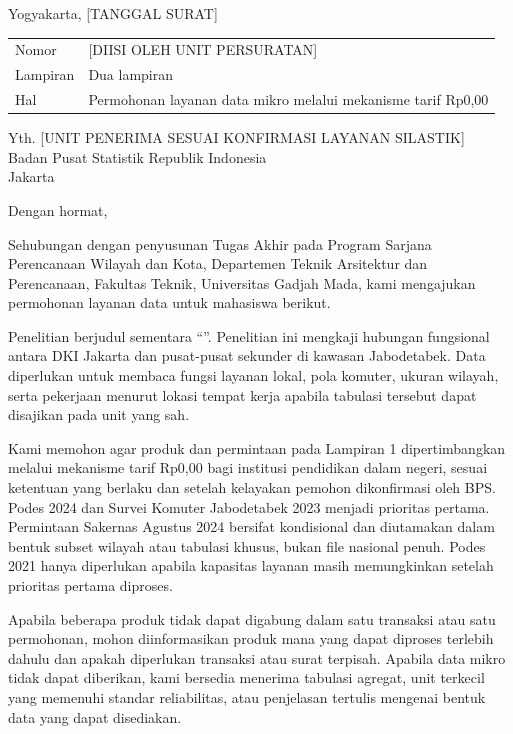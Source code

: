 \documentclass[12pt]{article}
\begin{document}
\KopSurat

\begin{flushright}
Yogyakarta, [TANGGAL SURAT]
\end{flushright}

\begin{tabularx}{\textwidth}{@{}P{0.20\textwidth}Y@{}}
  Nomor & [DIISI OLEH UNIT PERSURATAN] \\
  Lampiran & Dua lampiran \\
  Hal & Permohonan layanan data mikro melalui mekanisme tarif Rp0,00
\end{tabularx}

Yth. [UNIT PENERIMA SESUAI KONFIRMASI LAYANAN SILASTIK]\\
Badan Pusat Statistik Republik Indonesia\\
Jakarta

Dengan hormat,

Sehubungan dengan penyusunan Tugas Akhir pada Program Sarjana Perencanaan Wilayah dan Kota, Departemen Teknik Arsitektur dan Perencanaan, Fakultas Teknik, Universitas Gadjah Mada, kami mengajukan permohonan layanan data untuk mahasiswa berikut.

\IdentitasMahasiswa

Penelitian berjudul sementara ``\JudulSementara''. Penelitian ini mengkaji hubungan fungsional antara DKI Jakarta dan pusat-pusat sekunder di kawasan Jabodetabek. Data diperlukan untuk membaca fungsi layanan lokal, pola komuter, ukuran wilayah, serta pekerjaan menurut lokasi tempat kerja apabila tabulasi tersebut dapat disajikan pada unit yang sah.

Kami memohon agar produk dan permintaan pada Lampiran 1 dipertimbangkan melalui mekanisme tarif Rp0,00 bagi institusi pendidikan dalam negeri, sesuai ketentuan yang berlaku dan setelah kelayakan pemohon dikonfirmasi oleh BPS. Podes 2024 dan Survei Komuter Jabodetabek 2023 menjadi prioritas pertama. Permintaan Sakernas Agustus 2024 bersifat kondisional dan diutamakan dalam bentuk subset wilayah atau tabulasi khusus, bukan file nasional penuh. Podes 2021 hanya diperlukan apabila kapasitas layanan masih memungkinkan setelah prioritas pertama diproses.

Apabila beberapa produk tidak dapat digabung dalam satu transaksi atau satu permohonan, mohon diinformasikan produk mana yang dapat diproses terlebih dahulu dan apakah diperlukan transaksi atau surat terpisah. Apabila data mikro tidak dapat diberikan, kami bersedia menerima tabulasi agregat, unit terkecil yang memenuhi standar reliabilitas, atau penjelasan tertulis mengenai bentuk data yang dapat disediakan.
\end{document}
